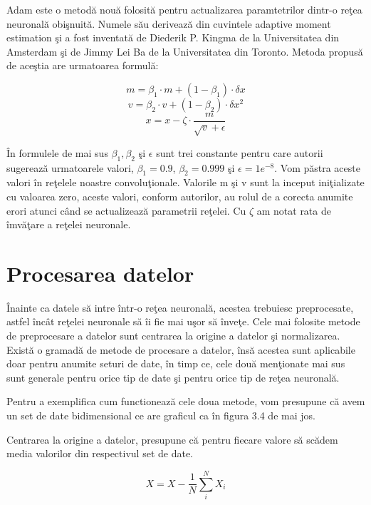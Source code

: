 Adam este o metod\u{a} nou\u{a} folosit\u{a} pentru actualizarea paramtetrilor dintr-o re\c{t}ea neuronal\u{a} obi\c{s}nuit\u{a}. Numele s\u{a}u deriveaz\u{a} din cuvintele adaptive moment estimation \c{s}i a fost inventat\u{a} de Diederik P. Kingma de la Universitatea din Amsterdam \c{s}i de Jimmy Lei Ba de la Universitatea din Toronto. Metoda propus\u{a} de ace\c{s}tia are urmatoarea formul\u{a}:

$$ m = \beta_1 \cdot m + ( 1 - \beta_1 ) \cdot \delta x $$
$$ v = \beta_2 \cdot v + ( 1- \beta_2 ) \cdot \delta x^2 $$
$$ x = x - \zeta \cdot \frac{m}{\sqrt{v} + \epsilon } $$

\^{I}n formulele de mai sus $\beta_1, \beta_2 $ \c{s}i $ \epsilon $ sunt trei constante pentru care autorii sugereaz\u{a} urmatoarele valori, $\beta_1 = 0.9 $, $\beta_2 = 0.999 $ \c{s}i $ \epsilon = 1e^{-8} $. Vom p\u{a}stra aceste valori \^{i}n re\c{t}elele noastre convolu\c{t}ionale. Valorile m \c{s}i v sunt la inceput ini\c{t}ializate cu valoarea zero, aceste valori, conform autorilor, au rolul de a corecta anumite erori atunci c\^{a}nd se actualizeaz\u{a} parametrii re\c{t}elei. Cu $\zeta$ am notat rata de \^{i}mv\u{a}\c{t}are a re\c{t}elei neuronale.

\section{Procesarea datelor}

\^{I}nainte ca datele s\u{a} intre \^{i}ntr-o re\c{t}ea neuronal\u{a}, acestea trebuiesc preprocesate, astfel \^{i}nc\^{a}t re\c{t}elei neuronale s\u{a} \^{i}i fie mai u\c{s}or s\u{a} \^{i}nve\c{t}e. Cele mai folosite metode de preprocesare a datelor sunt centrarea la origine a datelor \c{s}i normalizarea. Exist\u{a} o gramad\u{a} de metode de procesare a datelor, \^{i}ns\u{a} acestea sunt aplicabile doar pentru anumite seturi de date, \^{i}n timp ce, cele dou\u{a} men\c{t}ionate mai sus sunt generale pentru orice tip de date \c{s}i pentru orice tip de re\c{t}ea neuronal\u{a}.

Pentru a exemplifica cum functioneaz\u{a} cele doua metode, vom presupune c\u{a} avem un set de date bidimensional ce are graficul ca \^{i}n figura 3.4 de mai jos.

Centrarea la origine a datelor, presupune c\u{a} pentru fiecare valore s\u{a} sc\u{a}dem media valorilor din respectivul set de date.

            $$ X = X - \frac{1}{N}\sum_i^N X_i$$
            
